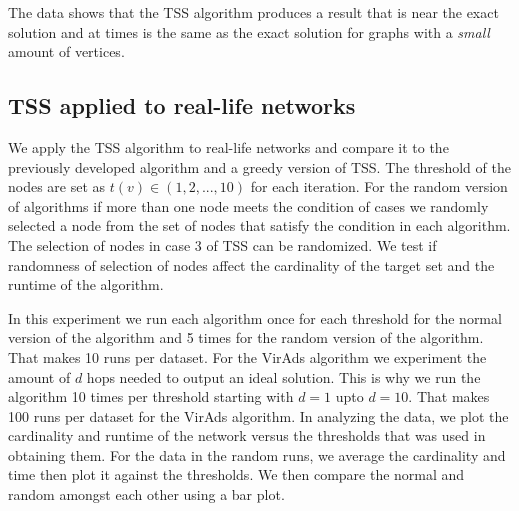 The data shows that the TSS algorithm produces a result that is near the exact solution and at times is the same as the exact solution for graphs with a \textit{small} amount of vertices.

\subsection{TSS applied to real-life networks}

We apply the TSS algorithm to real-life networks and compare it to the previously developed algorithm and a greedy version of TSS. The threshold of the nodes are set as $t(v)\in(1,2,...,10)$ for each iteration. For the random version of algorithms if more than one node meets the condition of cases we randomly selected a node from the set of nodes that satisfy the condition in each algorithm. The selection of nodes in case 3 of TSS can be randomized. We test if randomness of selection of nodes affect the cardinality of the target set and the runtime of the algorithm.

In this experiment we run each algorithm once for each threshold for the normal version of the algorithm and 5 times for the random version of the algorithm. That makes 10 runs per dataset. For the VirAds algorithm we experiment the amount of $d$ hops needed to output an ideal solution. This is why we run the algorithm 10 times per threshold starting with $d=1$ upto $d=10$. That makes 100 runs per dataset for the VirAds algorithm. In analyzing the data, we plot the cardinality and runtime of the network versus the thresholds that was used in obtaining them. For the data in the random runs, we average the cardinality and time then plot it against the thresholds. We then compare the normal and random amongst each other using a bar plot.

